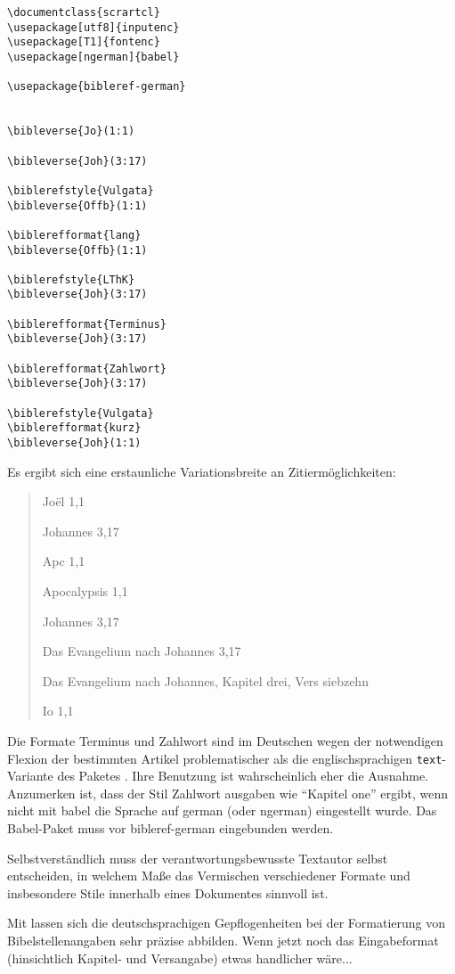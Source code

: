 \begin{lstlisting}
\documentclass{scrartcl} 
\usepackage[utf8]{inputenc}
\usepackage[T1]{fontenc}
\usepackage[ngerman]{babel}

\usepackage{bibleref-german}


\bibleverse{Jo}(1:1)

\bibleverse{Joh}(3:17) 

\biblerefstyle{Vulgata}
\bibleverse{Offb}(1:1)

\biblerefformat{lang}
\bibleverse{Offb}(1:1)

\biblerefstyle{LThK}
\bibleverse{Joh}(3:17) 

\biblerefformat{Terminus} 
\bibleverse{Joh}(3:17) 

\biblerefformat{Zahlwort}
\bibleverse{Joh}(3:17)

\biblerefstyle{Vulgata} 
\biblerefformat{kurz}
\bibleverse{Joh}(1:1)

\end{lstlisting}

Es ergibt sich eine erstaunliche Variationsbreite an Zitiermöglichkeiten:

\begin{quotation}
    Joël 1,1 
    
    Johannes 3,17
    
    Apc 1,1
    
    Apocalypsis 1,1
    
    Johannes 3,17
    
    Das Evangelium nach Johannes 3,17
    
    Das Evangelium nach Johannes, Kapitel drei, Vers siebzehn
    
    Io 1,1
\end{quotation}


Die Formate Terminus und Zahlwort sind im Deutschen wegen der notwendigen Flexion der bestimmten Artikel 
problematischer als die englischsprachigen \texttt{text}-Variante des Paketes . 
Ihre Benutzung ist wahrscheinlich eher die Ausnahme.
Anzumerken ist, dass der Stil Zahlwort ausgaben wie ``Kapitel one'' ergibt, wenn nicht mit babel
die Sprache auf german (oder ngerman) eingestellt wurde. Das Babel-Paket muss vor bibleref-german
eingebunden werden.

Selbstverständlich muss der verantwortungsbewusste Textautor selbst entscheiden, in welchem Maße
das Vermischen verschiedener Formate und insbesondere Stile innerhalb eines Dokumentes sinnvoll ist.

Mit  lassen sich die deutschsprachigen Gepflogenheiten bei der Formatierung von
Bibelstellenangaben sehr präzise abbilden. Wenn jetzt noch das Eingabeformat (hinsichtlich Kapitel- und
Versangabe) etwas handlicher wäre...


